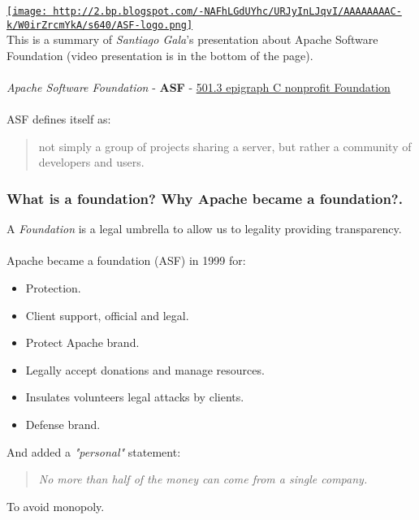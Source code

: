 \href{http://2.bp.blogspot.com/-NAFhLGdUYhc/URJyInLJqvI/AAAAAAAAC-k/W0irZrcmYkA/s1600/ASF-logo.png}{
\texttt{[image: http://2.bp.blogspot.com/-NAFhLGdUYhc/URJyInLJqvI/AAAAAAAAC-k/W0irZrcmYkA/s640/ASF-logo.png]}}
\\ This is a summary of \textit{Santiago Gala}'s presentation about Apache Software Foundation (video presentation is in the bottom of the page).
\\
\\\textit{Apache Software Foundation} - \textbf{ASF} - \href{http://en.wikipedia.org/wiki/501(c)_organization#501.28c.29.283.29}{501.3 epigraph C nonprofit Foundation}
\\
\\ ASF defines itself as:
\\
\begin{quotation} not simply a group of projects sharing a server, but rather a community of developers and users.
\end{quotation}

\subsubsection{ What is a foundation? Why Apache became a foundation?.} A \textit{Foundation} is a legal umbrella to allow us to legality providing transparency.
\\
\\ Apache became a foundation (ASF) in 1999 for:
\\
\begin{itemize}
	\item Protection.
	\item Client support, official and legal.
	\item Protect Apache brand.
	\item Legally accept donations and manage resources.
	\item Insulates volunteers legal attacks by clients.
	\item Defense brand.
\end{itemize} And added a \textit{"personal"} statement:
\\
\begin{quotation}\textit{No more than half of the money can come from a single company.}
\end{quotation} To avoid monopoly.
\\

